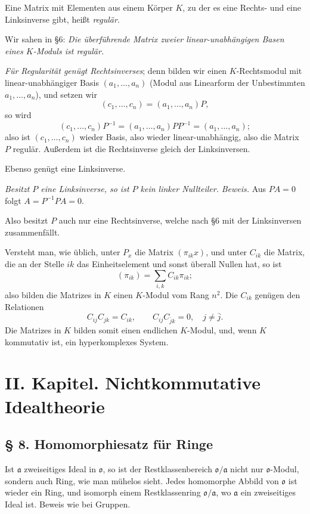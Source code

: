 \documentclass[11pt]{article}
\providecommand{\mo}{\mathfrak{o}}
\providecommand{\ma}{\mathfrak{a}}
\begin{document}
Eine Matrix mit Elementen aus einem Körper $K$, zu der es eine Rechts- und eine Linksinverse gibt, heißt \emph{regulär}.

Wir sahen in §6: \emph{Die überführende Matrix zweier linear-unabhängigen Basen eines $K$-Moduls ist regulär.}

\emph{Für Regularität genügt Rechtsinverses}; denn bilden wir einen $K$-Rechtsmodul mit linear-unabhängiger Basis $(a_1,\ldots,a_n)$ (Modul aus Linearform der Unbestimmten $a_1,\ldots,a_n$), und setzen wir
\[
        (c_1,\ldots,c_n)=(a_1,\ldots,a_n)P,
\]
so wird
\[
        (c_1,\ldots,c_n)P^{-1}=(a_1,\ldots,a_n)PP^{-1}=(a_1,\ldots,a_n);
\]
also ist $(c_1,\ldots,c_n)$ wieder Basis, also wieder linear-unabhängig, also die Matrix $P$ regulär. Außerdem ist die Rechtsinverse gleich der Linksinversen.

Ebenso genügt eine Linksinverse.

\emph{Besitzt $P$ eine Linksinverse, so ist $P$ kein linker Nullteiler.}
\emph{Beweis.} Aus $PA=0$ folgt $A=P^{-1}PA=0$.

Also besitzt $P$ auch nur eine Rechtsinverse, welche nach §6 mit der Linksinversen zusammenfällt.

Versteht man, wie üblich, unter $P_x$ die Matrix $(\pi_{ik}x)$, und unter $C_{ik}$ die Matrix, die an der Stelle $ik$ das Einheitselement und sonst überall Nullen hat, so ist
\[
        (\pi_{ik})=\sum_{i,k} C_{ik}\pi_{ik};
\]
also bilden die Matrizes in $K$ einen $K$-Modul vom Rang $n^2$. Die $C_{ik}$ genügen den Relationen
\[
        C_{ij}C_{jk}=C_{ik},
        \qquad
        C_{ij}C_{\bar j k}=0,\quad j\ne\bar j.
\]
Die Matrizes in $K$ bilden somit einen endlichen $K$-Modul, und, wenn $K$ kommutativ ist, ein hyperkomplexes System.

\section*{II. Kapitel. Nichtkommutative Idealtheorie}

\subsection*{§ 8. Homomorphiesatz für Ringe}

Ist $\ma$ zweiseitiges Ideal in $\mo$, so ist der Restklassenbereich $\mo/\ma$ nicht nur $\mo$-Modul, sondern auch Ring, wie man mühelos sieht. Jedes homomorphe Abbild von $\mo$ ist wieder ein Ring, und isomorph einem Restklassenring $\mo/\ma$, wo $\ma$ ein zweiseitiges Ideal ist. Beweis wie bei Gruppen.
\end{document}
